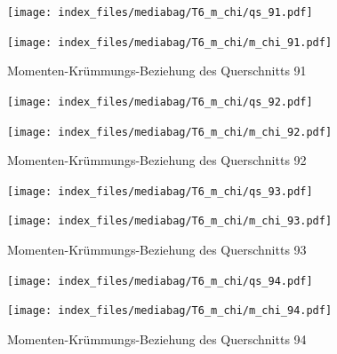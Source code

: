\documentclass[
  11pt,
  letterpaper,
]{scrreprt}
\begin{document}
\begin{figure}[H]

\begin{minipage}{0.50\linewidth}
\texttt{[image: index\_files/mediabag/T6\_m\_chi/qs\_91.pdf]}\end{minipage}%
%
\begin{minipage}{0.50\linewidth}
\texttt{[image: index\_files/mediabag/T6\_m\_chi/m\_chi\_91.pdf]}\end{minipage}%

\caption{\label{fig-mchi_anhang}Momenten-Krümmungs-Beziehung des
Querschnitts 91}

\end{figure}%

\begin{figure}[H]

\begin{minipage}{0.50\linewidth}
\texttt{[image: index\_files/mediabag/T6\_m\_chi/qs\_92.pdf]}\end{minipage}%
%
\begin{minipage}{0.50\linewidth}
\texttt{[image: index\_files/mediabag/T6\_m\_chi/m\_chi\_92.pdf]}\end{minipage}%

\caption{\label{fig-mchi_anhang}Momenten-Krümmungs-Beziehung des
Querschnitts 92}

\end{figure}%

\begin{figure}[H]

\begin{minipage}{0.50\linewidth}
\texttt{[image: index\_files/mediabag/T6\_m\_chi/qs\_93.pdf]}\end{minipage}%
%
\begin{minipage}{0.50\linewidth}
\texttt{[image: index\_files/mediabag/T6\_m\_chi/m\_chi\_93.pdf]}\end{minipage}%

\caption{\label{fig-mchi_anhang}Momenten-Krümmungs-Beziehung des
Querschnitts 93}

\end{figure}%

\begin{figure}[H]

\begin{minipage}{0.50\linewidth}
\texttt{[image: index\_files/mediabag/T6\_m\_chi/qs\_94.pdf]}\end{minipage}%
%
\begin{minipage}{0.50\linewidth}
\texttt{[image: index\_files/mediabag/T6\_m\_chi/m\_chi\_94.pdf]}\end{minipage}%

\caption{\label{fig-mchi_anhang}Momenten-Krümmungs-Beziehung des
Querschnitts 94}

\end{figure}%
\end{document}

